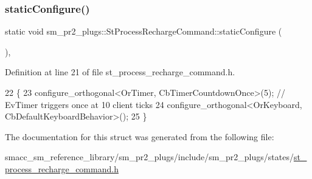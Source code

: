 \subsubsection{\texorpdfstring{static\+Configure()}{staticConfigure()}}
{\footnotesize\ttfamily static void sm\+\_\+pr2\+\_\+plugs\+::\+St\+Process\+Recharge\+Command\+::static\+Configure (\begin{DoxyParamCaption}{ }\end{DoxyParamCaption})\hspace{0.3cm}{\ttfamily [inline]}, {\ttfamily [static]}}



Definition at line 21 of file st\+\_\+process\+\_\+recharge\+\_\+command.\+h.


\begin{DoxyCode}
22     \{
23         configure\_orthogonal<OrTimer, CbTimerCountdownOnce>(5); \textcolor{comment}{// EvTimer triggers once at 10 client ticks}
24         configure\_orthogonal<OrKeyboard, CbDefaultKeyboardBehavior>();
25     \}
\end{DoxyCode}


The documentation for this struct was generated from the following file\+:\begin{DoxyCompactItemize}
\item 
smacc\+\_\+sm\+\_\+reference\+\_\+library/sm\+\_\+pr2\+\_\+plugs/include/sm\+\_\+pr2\+\_\+plugs/states/\hyperlink{st__process__recharge__command_8h}{st\+\_\+process\+\_\+recharge\+\_\+command.\+h}\end{DoxyCompactItemize}
